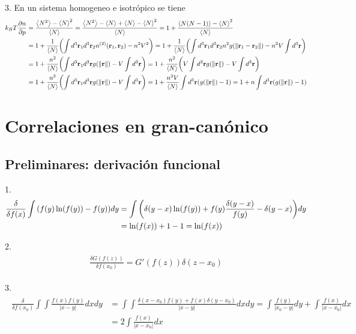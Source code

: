 \documentclass{article}
\begin{document}
3. En un sistema homogeneo e isotrópico se tiene
\begin{align}
\begin{split}
k_BT\frac{\partial n}{\partial p}&=\frac{\ev{N^2}-\ev{N}^2}{\ev{N}}=\frac{\ev{N^2}-\ev{N}+\ev{N}-\ev{N}^2}{\ev{N}}=1+\frac{\ev{N(N-1)}-\ev{N}^2}{\ev{N}}\\
&=1+\frac{1}{\ev{N}}\qty(\int d^3\vb{r}_1d^3\vb{r}_2n^{(2)}(\vb{r}_1,\vb{r}_2)-n^2V^2)=1+\frac{1}{\ev{N}}\qty(\int d^3\vb{r}_1d^3\vb{r}_2n^2g(\|\vb{r}_1-\vb{r}_2\|)-n^2V\int d^3\vb{r})\\
&=1+\frac{n^2}{\ev{N}}\qty(\int d^3\vb{r}_1d^3\vb{r}g(\|\vb{r}\|)-V\int d^3\vb{r})=1+\frac{n^2}{\ev{N}}\qty(V\int d^3\vb{r}g(\|\vb{r}\|)-V\int d^3\vb{r})\\
&=1+\frac{n^2}{\ev{N}}\qty(\int d^3\vb{r}_1d^3\vb{r}g(\|\vb{r}\|)-V\int d^3\vb{r})=1+\frac{n^2V}{\ev{N}}\int d^3\vb{r}\qty(g(\|\vb{r}\|)-1)=1+n\int d^3\vb{r}\qty(g(\|\vb{r}\|)-1)
\end{split}
\end{align}

\section{Correlaciones en gran-canónico}

\subsection{Preliminares: derivación funcional}

1.
\begin{align}
\begin{split}
\frac{\delta}{\delta f(x)}\int\qty(f(y)\ln(f(y))-f(y))dy&=\int\qty(\delta(y-x)\ln(f(y))+f(y)\frac{\delta(y-x)}{f(y)}-\delta(y-x))dy\\
&=\ln(f(x))+1-1=\ln(f(x))
\end{split}
\end{align}

2.
\begin{align}
\begin{split}
\frac{\delta G(f(z))}{\delta f(x_0)}=G'(f(z))\delta(z-x_0)
\end{split}
\end{align}

3.
\begin{align}
\begin{split}
\frac{\delta}{\delta f(x_0)}\int\int \frac{f(x)f(y)}{|x-y|}dxdy&=\int\int\frac{\delta(x-x_0)f(y)+f(x)\delta(y-x_0)}{|x-y|}dxdy=\int \frac{f(y)}{|x_0-y|} dy + \int \frac{f(x)}{|x-x_0|}dx\\
&=2\int \frac{f(x)}{|x-x_0|}dx
\end{split}
\end{align}
\end{document}
